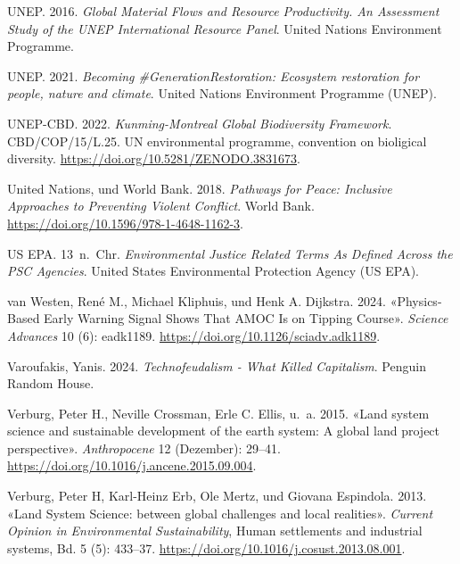 \documentclass[
  nswissgerman,
  a4paper,
  openany]{book}
\newlength{\cslhangindent}
\newenvironment{CSLReferences}[2] %
 {\begin{list}{}{%
  \setlength{\itemindent}{0pt}
  \setlength{\leftmargin}{0pt}
  \setlength{\parsep}{0pt}
  \ifodd #1
   \setlength{\leftmargin}{\cslhangindent}
   \setlength{\itemindent}{-1\cslhangindent}
  \fi
  \setlength{\itemsep}{#2\baselineskip}}}
 {\end{list}}
\begin{document}
\begin{CSLReferences}{1}{1}
UNEP. 2016. \emph{{Global Material Flows and Resource Productivity. An
Assessment Study of the UNEP International Resource Panel}}. United
Nations Environment Programme.

UNEP. 2021. \emph{Becoming \#{GenerationRestoration}: {Ecosystem}
restoration for people, nature and climate}. United Nations Environment
Programme (UNEP).

UNEP-CBD. 2022. \emph{Kunming-{Montreal Global} Biodiversity Framework}.
CBD/COP/15/L.25. UN environmental programme, convention on bioligical
diversity. \url{https://doi.org/10.5281/ZENODO.3831673}.

United Nations, und World Bank. 2018. \emph{Pathways for {Peace}:
{Inclusive Approaches} to {Preventing Violent Conflict}}. World Bank.
\url{https://doi.org/10.1596/978-1-4648-1162-3}.

US EPA. 13~n.~Chr. \emph{Environmental {Justice Related Terms As Defined
Across} the {PSC Agencies}}. United States Environmental Protection
Agency (US EPA).

{van Westen, René M., Michael Kliphuis, und Henk A. Dijkstra}. 2024.
{«Physics-Based Early Warning Signal Shows That {AMOC} Is on Tipping
Course»}. \emph{Science Advances} 10 (6): eadk1189.
\url{https://doi.org/10.1126/sciadv.adk1189}.

Varoufakis, Yanis. 2024. \emph{Technofeudalism - {What} Killed
Capitalism}. Penguin Random House.

Verburg, Peter H., Neville Crossman, Erle C. Ellis, u.~a. 2015. {«Land
system science and sustainable development of the earth system: {A}
global land project perspective»}. \emph{Anthropocene} 12 (Dezember):
29--41. \url{https://doi.org/10.1016/j.ancene.2015.09.004}.

Verburg, Peter H, Karl-Heinz Erb, Ole Mertz, und Giovana Espindola.
2013. {«Land {System} {Science}: between global challenges and local
realities»}. \emph{Current Opinion in Environmental Sustainability},
Human settlements and industrial systems, Bd. 5 (5): 433--37.
\url{https://doi.org/10.1016/j.cosust.2013.08.001}.


\end{CSLReferences}
\end{document}
